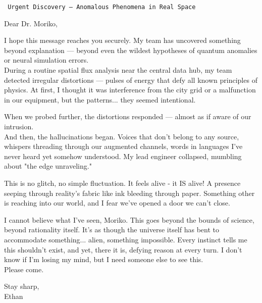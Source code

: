 \vspace{-10mm}
\begin{exampleblock}
	\setlength{\parskip}{4mm}
	\tt
	\small
	Urgent Discovery – Anomalous Phenomena in Real Space
	\par%
	Dear Dr. Moriko,
	\par%
	I hope this message reaches you securely.
	My team has uncovered something beyond explanation
		— beyond even the wildest hypotheses of quantum anomalies or neural simulation errors.
	\\%
	During a routine spatial flux analysis near the central data hub,
		my team detected irregular distortions
		— pulses of energy that defy all known principles of physics.
	At first, I thought it was interference from the city grid or a malfunction in our equipment,
	but the patterns... they seemed intentional.
	\par%
	When we probed further, the distortions responded
		— almost as if aware of our intrusion.
	\\%
	And then, the hallucinations began.
	Voices that don’t belong to any source,
		whispers threading through our augmented channels,
		words in languages I’ve never heard yet somehow understood.
	My lead engineer collapsed, mumbling about "the edge unraveling."
	\par%
	This is no glitch, no simple fluctuation.
	It feels alive - it IS alive!
	A presence seeping through reality’s fabric like ink bleeding through paper.
	Something other is reaching into our world, and I fear we’ve opened a door we can’t close.
	\par%
	I cannot believe what I’ve seen, Moriko.
	This goes beyond the bounds of science, beyond rationality itself.
	It's as though the universe itself has bent to accommodate something... alien, something impossible.
	Every instinct tells me this shouldn’t exist, and yet, there it is,
		defying reason at every turn.
	I don’t know if I’m losing my mind, but I need someone else to see this.
	\\%
	Please come.
	\par%
	Stay sharp,
	\\%
	Ethan
\end{exampleblock}

